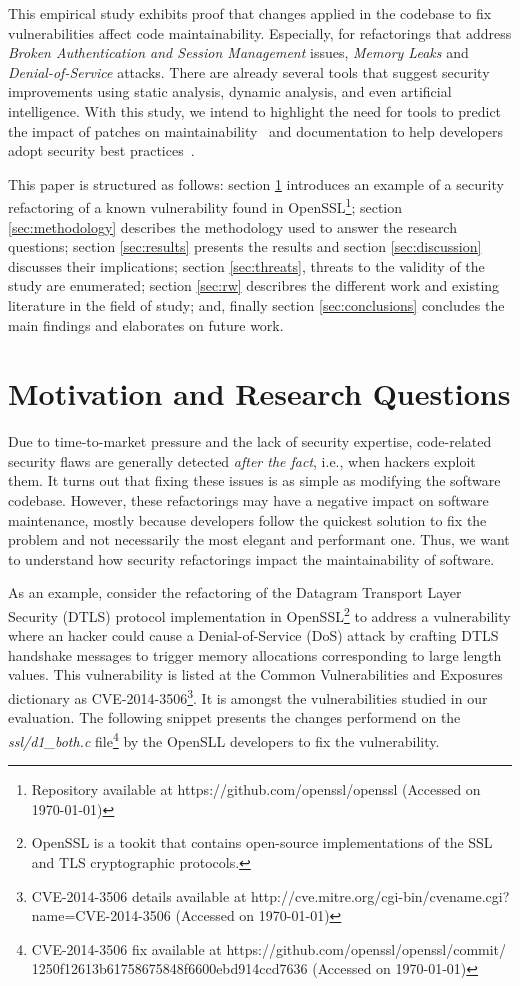 \documentclass[10pt,conference]{IEEEtran}
\begin{document}
This empirical study exhibits proof that changes applied in the codebase to fix
vulnerabilities affect code maintainability. Especially, for refactorings that
address \emph{Broken Authentication and Session Management} issues, \emph{Memory
Leaks} and \emph{Denial-of-Service} attacks. There are already several tools that 
suggest security improvements using static analysis, dynamic analysis, and even 
artificial intelligence. With this study, we intend to highlight the need for tools 
to predict the impact of patches on maintainability~\cite{4724577} and documentation
to help developers adopt security best practices~\cite{6311252, 7927935, MESQUIDA201519}.

This paper is structured as follows: section \ref{sec:motivation} introduces an
example of a security refactoring of a known vulnerability found in
OpenSSL\footnote{Repository available at https://github.com/openssl/openssl
(Accessed on \today{})}; section \ref{sec:methodology} describes the
methodology used to answer the research questions; section \ref{sec:results}
presents the results and section \ref{sec:discussion} discusses their
implications; section \ref{sec:threats}, threats to the validity of the study
are enumerated; section \ref{sec:rw} describres the different work and existing
literature in the field of study; and, finally section \ref{sec:conclusions}
concludes the main findings and elaborates on future work.
%
\section{Motivation and Research Questions}\label{sec:motivation}
%
Due to time-to-market pressure and the lack of security expertise, code-related
security flaws are generally detected \textit{after the fact}, i.e., when
hackers exploit them. It turns out that fixing these issues is as simple as
modifying the software codebase. However, these refactorings may have a negative
impact on software maintenance, mostly because developers follow the quickest
solution to fix the problem and not necessarily the most elegant and performant
one. Thus, we want to understand how security refactorings impact the
maintainability of software.

As an example, consider the refactoring of the Datagram Transport Layer Security
(DTLS) protocol implementation in OpenSSL\footnote{OpenSSL is a tookit that
contains open-source implementations of the SSL and TLS cryptographic
protocols.} to address a vulnerability where an hacker could cause a Denial-of-Service
(DoS) attack by crafting DTLS handshake messages to trigger memory allocations
corresponding to large length values. This vulnerability is listed at the Common
Vulnerabilities and Exposures dictionary as CVE-2014-3506\footnote{CVE-2014-3506
details available at http://cve.mitre.org/cgi-bin/cvename.cgi?name=CVE-2014-3506
(Accessed on \today{})}. It is amongst the vulnerabilities studied in our
evaluation. The following snippet presents the changes performend on the
\emph{ssl/d1\_both.c} file\footnote{CVE-2014-3506 fix available  at
https://github.com/openssl/openssl/commit/\\1250f12613b61758675848f6600ebd914ccd7636
(Accessed on \today{})} by the OpenSLL developers to fix the vulnerability.
\end{document}
